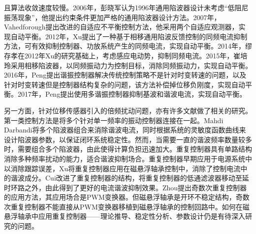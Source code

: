 且算法收敛速度较慢\cite{matras2006suppression}。2006年，彭晓军认为1996年通用陷波器设计未考虑“低阻尼振荡现象”，他提出约束条件更加严格的通用陷波器设计方法\cite{彭晓军2006磁电轴承中抑制不平衡振动的陷波滤波器设计方法}。2007年，Vahedforough提出改进的自适应不平衡控制方法，他采用两个自适应观测器，实现自动平衡\cite{vahedforough2007estimation}。2012年，Xu提出了一种基于相移通用陷波反馈控制的同频电流抑制方法，可有效抑制控制器、功放系统产生的同频电流，实现自动平衡\cite{xu2012stability}。2014年，缪存孝在2012年Xu的研究基础上，考虑感应电动势，抑制同频电流\cite{缪存孝2014含转子不平衡的磁轴承建模与同频电流抑制}。2015年，崔培玲采用相移陷波器，以同频振动力为控制目标，消除同频振动力，实现自动平衡\cite{崔培玲2015基于相移陷波器的磁轴承不平衡振动全频自适应控制}。2016年，Peng提出谐振控制器解决传统控制策略不是针对时变转速的问题，以及针对时变转速但是控制器结构复杂的问题，该方法补偿掉位移负刚度，实现自动平衡\cite{peng2016synchronous}。2017年，Peng提出使用多谐振控制器抑制基波和谐波电流，实现自动平衡\cite{peng2016frequency}。

另一方面，针对位移传感器引入的倍频扰动问题，亦有许多文献做了相关的研究。第一类控制方法是将多个针对单一频率的振动控制器连接在一起。Mahdi Darbandi将多个陷波器组合来消除谐波电流，同时根据系统的灵敏度函数曲线来设计陷波器参数，以保证闭环系统稳定性\cite{mahdi2017harmonic}。然而，当需要一直的谐波频率数量较多时，需要组合多个陷波器，由此使得计算负担迅速加大。重复控制器具有单路结构消除多种频率扰动的能力，适合谐波抑制场合。重复控制器早期应用于电源系统中以消除跟踪误差\cite{zhou2008plug}，Xu将重复控制器应用在磁悬浮轴承控制中，消除了控制电流中的谐波成分\cite{xu2015model}。Cui改进了重复控制器的结构，将重复控制器的低通滤波器移动至延时环路之外，由此得到了更好的电流谐波抑制效果\cite{cui2016suppression}。Zhou提出奇数次重复控制器的应用方法，其应用场合是PWM变换器\cite{zhou2006zero}。但磁悬浮轴承是开环不稳定结构，奇数次重复控制器不能直接从PWM变换器移植到磁悬浮轴承的控制回路中。如何在磁悬浮轴承中应用重复控制器——理论推导、稳定性分析、参数设计仍是有待深入研究的问题。

